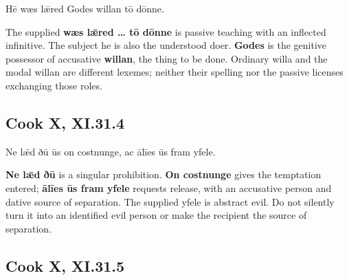 \par\begin{minipage}{\linewidth}\raggedright
Hē wæs lǣred Godes willan tō dōnne.

The supplied \textbf{wæs lǣred … tō dōnne} is passive teaching with an inflected infinitive. The subject he is also the understood doer. \textbf{Godes} is the genitive possessor of accusative \textbf{willan}, the thing to be done. Ordinary willa and the modal willan are different lexemes; neither their spelling nor the passive licenses exchanging those roles.

\end{minipage}\par\addvspace{4pt}

\subsection*{Cook X, XI.31.4}

\par\begin{minipage}{\linewidth}\raggedright
Ne lǣd ðū ūs on costnunge, ac ālīes ūs fram yfele.

\textbf{Ne lǣd ðū} is a singular prohibition. \textbf{On costnunge} gives the temptation entered; \textbf{ālīes ūs fram yfele} requests release, with an accusative person and dative source of separation. The supplied yfele is abstract evil. Do not silently turn it into an identified evil person or make the recipient the source of separation.

\end{minipage}\par\addvspace{4pt}

\subsection*{Cook X, XI.31.5}

